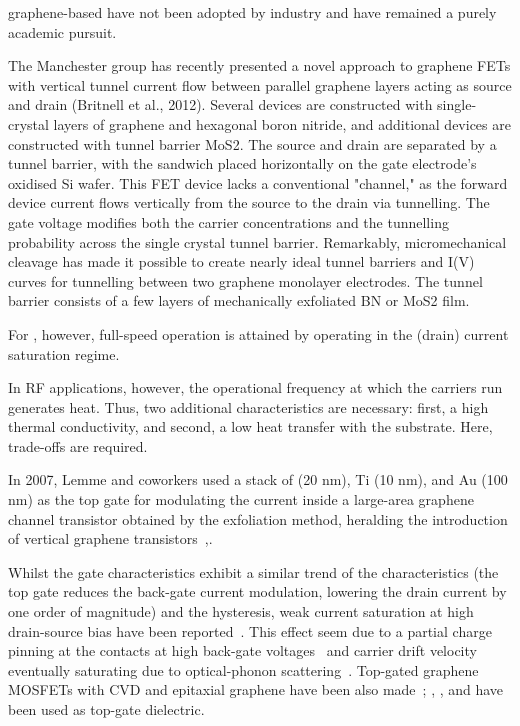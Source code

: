 graphene-based  have not been adopted by industry and have remained a purely academic pursuit.


The Manchester group has recently presented a novel approach to graphene FETs with vertical tunnel current flow between parallel graphene layers acting as source and drain (Britnell et al., 2012). Several devices are constructed with single-crystal layers of graphene and hexagonal boron nitride, and additional devices are constructed with tunnel barrier MoS2. The source and drain are separated by a tunnel barrier, with the sandwich placed horizontally on the gate electrode's oxidised Si wafer. This FET device lacks a conventional "channel," as the forward device current flows vertically from the source to the drain via tunnelling. The gate voltage modifies both the carrier concentrations and the tunnelling probability across the single crystal tunnel barrier. Remarkably, micromechanical cleavage has made it possible to create nearly ideal tunnel barriers and I(V) curves for tunnelling between two graphene monolayer electrodes. The tunnel barrier consists of a few layers of mechanically exfoliated BN or MoS2 film.

For , however, full-speed operation is attained by operating in the (drain) current saturation regime.

In \gls{RF} applications, however, the operational frequency at which the carriers run generates heat. Thus, two additional characteristics are necessary: first, a high thermal conductivity, and second, a low heat transfer with the substrate. Here, trade-offs are required.

In 2007, Lemme and coworkers used a stack of  (20 nm), Ti (10 nm), and Au (100 nm) as the top gate for modulating the current inside a large-area graphene channel transistor obtained by the exfoliation method, heralding the introduction of vertical graphene transistors~\cite{lemme2007graphene},.

Whilst the gate characteristics exhibit a similar trend of the characteristics (the top gate reduces the back-gate current modulation, lowering the drain current by one order of magnitude) and the hysteresis, weak current saturation at high drain-source bias have been reported~\cite{moon2009epitaxial}.
This effect seem due to a partial charge pinning at the contacts at high back-gate voltages~\cite{di2011charge} and carrier drift velocity eventually saturating due to optical-phonon scattering~\cite{meric2008current}. Top-gated graphene \glspl{MOSFET} with CVD and epitaxial graphene have been also made~\cite{kedzierski2008epitaxial, lin2010100}; , , and  have been  used as top-gate dielectric.

